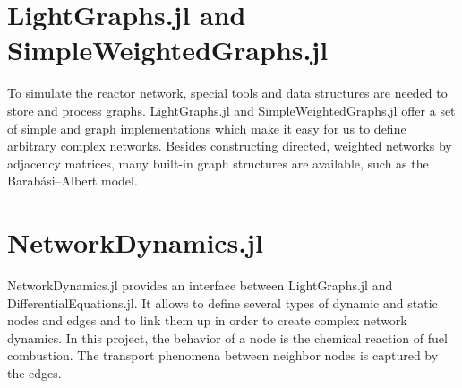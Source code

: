 \section{LightGraphs.jl and SimpleWeightedGraphs.jl}

To simulate the reactor network, special tools and data structures are needed to store and process graphs. LightGraphs.jl and SimpleWeightedGraphs.jl \parencite{LightGraphs} offer a set of simple and graph implementations which make it easy for us to define arbitrary complex networks. Besides constructing directed, weighted networks by adjacency matrices, many built-in graph structures are available, such as the Barab\'{a}si–Albert model.

\section{NetworkDynamics.jl}

NetworkDynamics.jl \parencite{NetworkDynamics.jl} provides an interface between LightGraphs.jl and DifferentialEquations.jl. It allows to define several types of dynamic and static nodes and edges and to link them up in order to create complex network dynamics. In this project, the behavior of a node is the chemical reaction of fuel combustion. The transport phenomena between neighbor nodes is captured by the edges.
